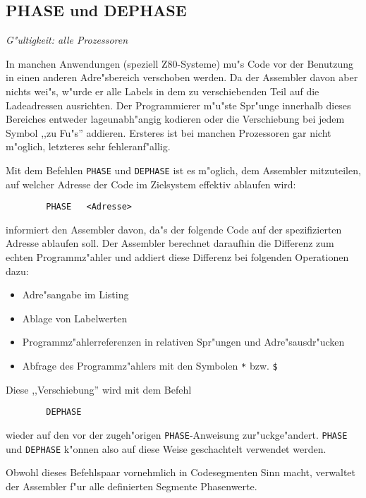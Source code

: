 \documentclass[12pt,a4paper,twoside]{report}
\makeatletter
\newcommand{\tty}[1]{{\tt #1}}
\newcommand{\ttindex}[1]{\index{#1@{\tt #1}}}
\makeatother
\begin{document}

\subsection{PHASE und DEPHASE}
\ttindex{PHASE}\ttindex{DEPHASE}

{\em G"ultigkeit: alle Prozessoren}

In manchen Anwendungen (speziell Z80-Systeme) mu"s Code vor der
Benutzung in einen anderen Adre"sbereich verschoben werden.  Da der
Assembler davon aber nichts wei"s, w"urde er alle Labels in dem zu
verschiebenden Teil auf die Ladeadressen ausrichten.  Der Programmierer
m"u"ste Spr"unge innerhalb dieses Bereiches entweder lageunabh"angig
kodieren oder die Verschiebung bei jedem Symbol ,,zu Fu"s'' addieren.
Ersteres ist bei manchen Prozessoren gar nicht m"oglich, letzteres sehr
fehleranf"allig.
\par
Mit dem Befehlen \tty{PHASE} und \tty{DEPHASE} ist es m"oglich, dem
Assembler mitzuteilen, auf welcher Adresse der Code im Zielsystem
effektiv ablaufen wird:
\begin{verbatim}
        PHASE   <Adresse>
\end{verbatim}
informiert den Assembler davon, da"s der folgende Code auf der
spezifizierten Adresse ablaufen soll.  Der Assembler berechnet
daraufhin die Differenz zum echten Programmz"ahler und addiert diese
Differenz bei folgenden Operationen dazu:
\begin{itemize}
\item{Adre"sangabe im Listing}
\item{Ablage von Labelwerten}
\item{Programmz"ahlerreferenzen in relativen Spr"ungen und
      Adre"sausdr"ucken}
\item{Abfrage des Programmz"ahlers mit den Symbolen \verb!*! bzw. \verb!$!}
\end{itemize}
Diese ,,Verschiebung'' wird mit dem Befehl
\begin{verbatim}
        DEPHASE
\end{verbatim}
wieder auf den vor der zugeh"origen \tty{PHASE}-Anweisung zur"uckge"andert.
\tty{PHASE} und \tty{DEPHASE} k"onnen also auf diese Weise geschachtelt
verwendet werden.
\par
Obwohl dieses Befehlspaar vornehmlich in Codesegmenten Sinn macht,
verwaltet der Assembler f"ur alle definierten Segmente Phasenwerte.

\end{document}
